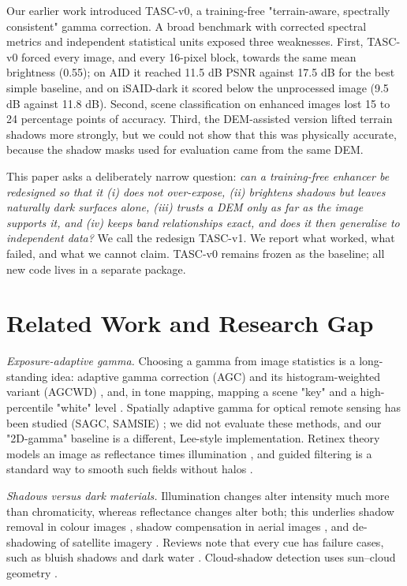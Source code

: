 \documentclass[conference]{IEEEtran}
\begin{document}
Our earlier work introduced TASC-v0, a training-free "terrain-aware, spectrally consistent" gamma correction. A broad benchmark with corrected spectral metrics and independent statistical units exposed three weaknesses. First, TASC-v0 forced every image, and every 16-pixel block, towards the same mean brightness (0.55); on AID it reached 11.5 dB PSNR against 17.5 dB for the best simple baseline, and on iSAID-dark it scored below the unprocessed image (9.5 dB against 11.8 dB). Second, scene classification on enhanced images lost 15 to 24 percentage points of accuracy. Third, the DEM-assisted version lifted terrain shadows more strongly, but we could not show that this was physically accurate, because the shadow masks used for evaluation came from the same DEM.

This paper asks a deliberately narrow question: \emph{can a training-free enhancer be redesigned so that it (i) does not over-expose, (ii) brightens shadows but leaves naturally dark surfaces alone, (iii) trusts a DEM only as far as the image supports it, and (iv) keeps band relationships exact, and does it then generalise to independent data?} We call the redesign TASC-v1. We report what worked, what failed, and what we cannot claim. TASC-v0 remains frozen as the baseline; all new code lives in a separate package.

\section{Related Work and Research Gap}
\emph{Exposure-adaptive gamma.} Choosing a gamma from image statistics is a long-standing idea: adaptive gamma correction (AGC) and its histogram-weighted variant (AGCWD) \cite{rahman2016agc,huang2013agcwd}, and, in tone mapping, mapping a scene "key" and a high-percentile "white" level \cite{reinhard2002tonerep}. Spatially adaptive gamma for optical remote sensing has been studied (SAGC, SAMSIE) \cite{huang2018sagc,huang2022samsie}; we did not evaluate these methods, and our "2D-gamma" baseline is a different, Lee-style implementation. Retinex theory models an image as reflectance times illumination \cite{land1971retinex,jobson1997msr}, and guided filtering is a standard way to smooth such fields without halos \cite{he2013guided}.

\emph{Shadows versus dark materials.} Illumination changes alter intensity much more than chromaticity, whereas reflectance changes alter both; this underlies shadow removal in colour images \cite{finlayson2006shadows}, shadow compensation in aerial images \cite{tsai2006shadow}, and de-shadowing of satellite imagery \cite{richter2005deshadow}. Reviews note that every cue has failure cases, such as bluish shadows and dark water \cite{shahtahmassebi2013shadow}. Cloud-shadow detection uses sun--cloud geometry \cite{zhu2012fmask}.
\end{document}
